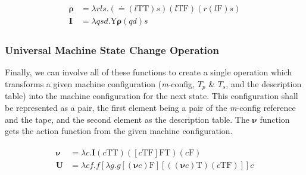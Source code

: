\documentclass[Master.tex]{subfiles}
\begin{document}
\begin{gather*}
\begin{aligned}
\bm{\rho} &= \lambda rls.(\bm{\doteq}(l\bm{\mathrm{TT}})s)(l\bm{\mathrm{TF}})(r(l\bm{\mathrm{F}})s)\\
\bm{I} &= \lambda qsd.\bm{\mathrm{Y}\rho}(qd)s
\end{aligned}
\end{gather*}

\subsubsection{Universal Machine State Change Operation}

Finally, we can involve all of these functions to create a single operation which transforms a given machine configuration (\textit{m}-config, $T_p$ \& $T_s$, and the description table) into the machine configuration for the next state. This configuration shall be represented as a pair, the first element being a pair of the \textit{m}-config reference and the tape, and the second element as the description table. The $\bm{\nu}$ function gets the action function from the given machine configuration.

\begin{gather*}
\begin{aligned}
\bm{\nu} &= \lambda c.\bm{I}(c\bm{\mathrm{TT}})([c\bm{\mathrm{TF}}]\bm{\mathrm{FT}})(c\bm{\mathrm{F}})\\
\bm{U} &= \lambda cf.f[\lambda g.g[(\bm{\nu}c)\bm{\mathrm{F}}][((\bm{\nu}c)\bm{\mathrm{T}})(c\bm{\mathrm{TF}})]]c
\end{aligned}
\end{gather*}
\end{document}
